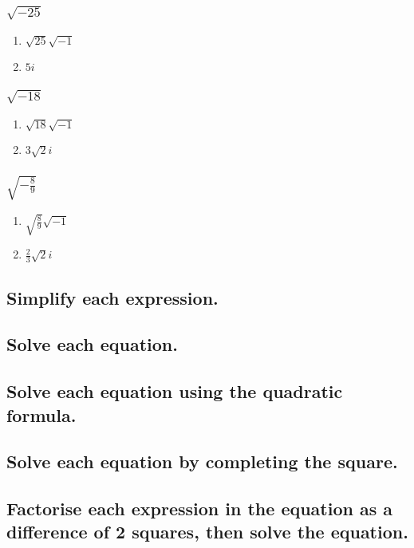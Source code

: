 \documentclass{report}
\begin{document}
                \subsubsection{$\sqrt{-25}$}
                    \begin{enumerate}
                        \item $\sqrt{25}\sqrt{-1}$
                        \item $5i$
                    \end{enumerate}
                \subsubsection{$\sqrt{-18}$}
                    \begin{enumerate}
                        \item $\sqrt{18}\sqrt{-1}$
                        \item $3\sqrt{2}i$
                    \end{enumerate}
                \subsubsection{$\sqrt{-\frac{8}{9}}$}
                    \begin{enumerate}
                        \item $\sqrt{\frac{8}{9}}\sqrt{-1}$
                        \item $\frac{2}{3}\sqrt{2}i$
                    \end{enumerate}
            \subsection{Simplify each expression.}
            \subsection{Solve each equation.}
            \subsection{Solve each equation using the quadratic formula.}
            \subsection{Solve each equation by completing the square.}
            \subsection{Factorise each expression in the equation as a difference of 2 squares, then solve the equation.}
\end{document}
